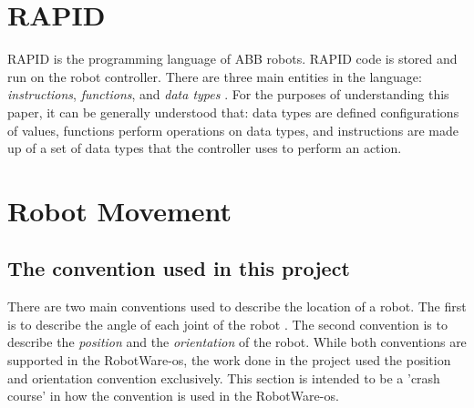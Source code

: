 \documentclass{cslthse-msc}
\begin{document}
\section{RAPID}
\label{sec:Tech_Back:Rapid}
RAPID is the programming language of ABB robots. RAPID code is stored and run on the robot controller. There are three main entities in the language: \textit{instructions}, \textit{functions}, and \textit{data types} \cite{ABB:rapid_instructions}. For the purposes of understanding this paper, it can be generally understood that: data types are defined configurations of values, functions perform operations on data types, and instructions are made up of a set of data types that the  controller uses to perform an action. 

\section{Robot Movement}
\label{sec:Tech_Back:Rob_Move}

\subsection{The convention used in this project}
\label{sec:Tech_Back:Rob_Move:conventions}
There are two main conventions used to describe the location of a robot. The first is to describe the angle of each joint of the robot . The second convention is to describe the \textit{position} and the \textit{orientation} of the robot. While both conventions are supported in the RobotWare-os, the work done in the project used the position and orientation convention exclusively. This section is intended to be a 'crash course' in how the convention is used in the RobotWare-os. 
\end{document}
